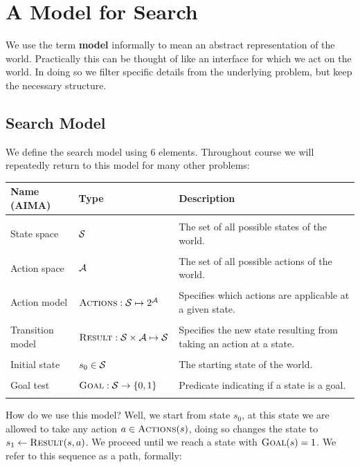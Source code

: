 \documentclass[11pt]{article}
\begin{document}
\section{A Model for Search}

We use the term \textbf{model} informally to mean an abstract representation of the world. 
Practically this can be thought of like an interface for which we act on the world. In doing
so we filter specific details from the underlying problem, but keep the necessary structure. 

\subsection{Search Model}

We define the search model using 6 elements. Throughout course we will
repeatedly return to this model for many other problems:

 \air
\begin{center}
\begin{tabularx}{\linewidth}{llX}
  \toprule
  Name (AIMA) & Type & Description \\
  \midrule
\\
 State space & $\mathcal{S}$ & The set of all possible states of the world. \\\\
 Action space & $\mathcal{A}$& The set of all possible actions of the world. \\\\
 Action model&  $\mathrm{\textsc{Actions}}: \mathcal{S} \mapsto 2^{\mathcal{A}}$ & Specifies which actions are applicable at a given state. \\\\
 Transition model&  $\mathrm{\textsc{Result}}:  \mathcal{S} \times \mathcal{A} \mapsto \mathcal{S} $ &  Specifies the new state resulting from taking an action at a state.  \\\\
 Initial state &  $s_0 \in \mathcal{S}$ & The starting state of the world.  \\\\
 Goal test& $\mathrm{\textsc{Goal}}: \mathcal{S} \rightarrow \{0, 1\}$ & Predicate indicating if a state is a goal. \\\\
 \bottomrule
\end{tabularx}
\end{center}

\air

\noindent How do we use this model? Well, we start from state $s_0$, at this state we are allowed to take 
any action $a \in \mathrm{\textsc{Actions}}(s)$, doing so changes the state to $s_1 \gets \mathrm{\textsc{Result}}(s, a)$. 
We proceed until we reach a state with $\mathrm{\textsc{Goal}}(s) = 1$. We refer to this sequence as a path, formally:
\end{document}
